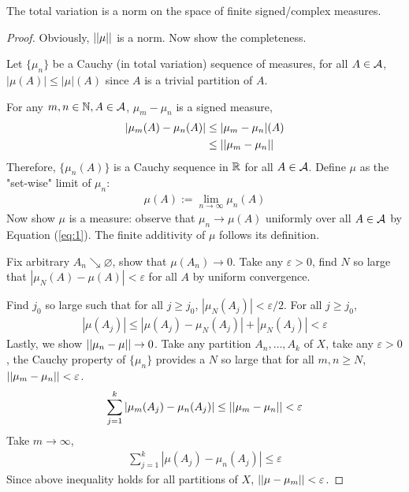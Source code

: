 \documentclass[11pt]{article}
\begin{document}
	\begin{proposition}
		The total variation is a norm on the space of finite signed/complex measures.
		\begin{proof}
			Obviously, $\vert \vert {\mu} \vert \vert$ is a norm. Now show the completeness.
			
			Let $\{\mu_n\}$ be a Cauchy (in total variation) sequence of measures, for all $A \in \mathcal{{A}}$, $|\mu(A)| \leq |\mu|(A)$ since $A$ is a trivial partition of $A$.
			
			For any $m, n \in \mathbb{N}, A \in \mathcal{{A}}$, $\mu_m - \mu_n$ is a signed measure,
			\begin{align}
				\left \vert {\mu_m(A) - \mu_n(A)} \right \vert &\leq |\mu_m - \mu_n|(A) \\
				&\leq \vert \vert {\mu_m - \mu_n} \vert \vert \label{eq:1}
			\end{align}
			Therefore, $\{\mu_n(A)\}$ is a Cauchy sequence in $\mathbb{R}$ for all $A \in \mathcal{{A}}$. Define $\mu$ as the "set-wise" limit of $\mu_n$:
			\begin{align}
				\mu(A) := \lim_{n\to\infty}\mu_n(A)
			\end{align}
			Now show $\mu$ is a measure: observe that $\mu_n \to \mu(A)$ uniformly over all $A \in \mathcal{{A}}$ by Equation (\ref{eq:1}).
			The finite additivity of $\mu$ follows its definition.
			
			Fix arbitrary $A_n \searrow \varnothing$, show that $\mu(A_n) \to 0$. Take any $\varepsilon > 0$, find $N$ so large that $|\mu_N(A) - \mu(A)| < \varepsilon$ for all $A$ by uniform convergence.
			
			Find $j_0$ so large such that for all $j \geq j_0$, $|\mu_N(A_j)| < \varepsilon / 2$. For all $j \geq j_0$,
			\begin{align}
				|\mu(A_j)| \leq |\mu(A_j) - \mu_N(A_j)| + |\mu_N(A_j)| < \varepsilon
			\end{align}
			Lastly, we show $\vert \vert {\mu_n - \mu} \vert \vert \to 0$. Take any partition $A_n, \dots, A_k$ of $X$, take any $\varepsilon > 0$, the Cauchy property of $\{\mu_n\}$ provides a $N$ so large that for all $m, n \geq N$, $\vert \vert {\mu_m - \mu_n} \vert \vert < \varepsilon$.
			\begin{align}
				\sum_{j=1}^k |\mu_m (A_j) - \mu_n(A_j)| \leq \vert \vert {\mu_m - \mu_n} \vert \vert < \varepsilon
			\end{align}
			Take $m \to \infty$,
			\begin{align}
				\sum_{j=1}^k |\mu (A_j) - \mu_n(A_j)| \leq \varepsilon
			\end{align}
			Since above inequality holds for all partitions of $X$, $\vert \vert {\mu - \mu_m} \vert \vert < \varepsilon$.
		\end{proof}
	\end{proposition}
	
\end{document}
